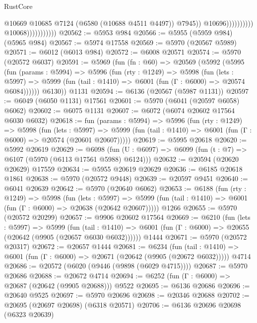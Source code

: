\begin{lexlean}{RustCore}
\begin{coremodule}
                                                  @10669
                                                  @10685
                                                  @7124
                                                  (@6580 (@10688 @4511 @4497))
                                                  @7945))
                                              @10696))))))))))
                          @10068)))))))))))
@20562 := @5953 @984
@20566 := @5955 (@5959 @984) (@5965 @984)
@20567 := @5974 @17558
@20569 := @5970 (@20567 @5989)
@20571 := @6012 (@6013 @984)
@20572 := @6008 @20571
@20574 := @5970 (@20572 @6037)
@20591 := @5969
    (fun (fn : @60) =>
    @20569
      (@5992
        (@5995
          (fun (params : @5994) =>
          @5996
            (fun (rty : @1249) =>
            @5998
              (fun (lets : @5997) =>
              @5999 (fun (tail : @1410) => @6001 (fun (Γ : @6000) => @20574 @6084))))))
        @6130))
    @1131
@20594 := @6136 (@20567 (@5987 @1131))
@20597 := @6049 (@6050 @1131) @17561
@20601 := @5970 (@6041 (@20597 @6058) @6062)
@20602 := @6075 @1131
@20607 := @6072 (@6074 @20602 @17564 @6030 @6032)
@20618 := fun (params : @5994) =>
  @5996
    (fun (rty : @1249) =>
    @5998
      (fun (lets : @5997) =>
      @5999 (fun (tail : @1410) => @6001 (fun (Γ : @6000) => @20574 (@20601 @20607)))))
@20619 := @5995 @20618
@20620 := @5992 @20619
@20629 := @6098
    (fun (U : @6097) => @6099 (fun (t : @7) => @6107 (@5970 (@6113 @17561 @5988) @6124)))
@20632 := @20594 (@20620 @20629) @17559
@20634 := @5955 @20619 @20629
@20636 := @6185 @20618 @1861
@20638 := @5970 (@20572 @9448)
@20639 := @20597 @9451
@20640 := @6041 @20639
@20642 := @5970 (@20640 @6062)
@20653 := @6188
    (fun (rty : @1249) =>
    @5998
      (fun (lets : @5997) =>
      @5999 (fun (tail : @1410) => @6001 (fun (Γ : @6000) => @20638 (@20642 @20607)))))
    @1266
@20655 := @5970 (@20572 @20299)
@20657 := @9906 @20602 @17564
@20669 := @6210
    (fun (lets : @5997) =>
    @5999
      (fun (tail : @1410) =>
      @6001 (fun (Γ : @6000) => @20655 (@20642 (@9905 (@20657 @6030 @6032))))))
    @1444
@20671 := @5970 (@20572 @20317)
@20672 := @20657 @1444
@20681 := @6234
    (fun (tail : @1410) => @6001 (fun (Γ : @6000) => @20671 (@20642 (@9905 (@20672 @6032)))))
    @4714
@20686 := @20572 (@6020 (@9446 (@9898 (@6029 @4715))))
@20687 := @5970 @20686
@20688 := @20672 @4714
@20694 := @6252 (fun (Γ : @6000) => @20687 (@20642 (@9905 @20688))) @9522
@20695 := @6136 @20686
@20696 := @20640 @9525
@20697 := @5970 @20696
@20698 := @20346 @20688
@20702 := @20695 (@20697 @20698) (@6318 @20571)
@20706 := @6136 @20696 @20698 (@6323 @20639)

\end{coremodule}
\end{lexlean}

